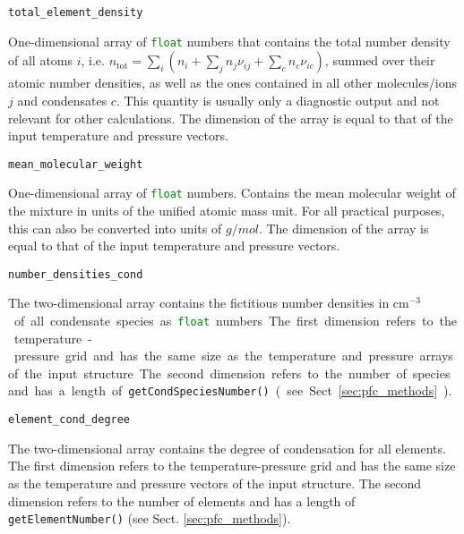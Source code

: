 \documentclass[numbers=noenddot]{aux/fcmanual}
\begin{document}
\bigbreak

\lstinline!total_element_density!
\begin{addmargin}[25pt]{0pt}
	One-dimensional array of \lstinline[language=Python]!float! numbers that contains the total number density of all atoms $i$, i.e. $n_\mathrm{tot} = \sum_i \left( n_i + \sum_j n_j \nu_{ij} + \sum_c n_c \nu_{ic} \right)$, summed over their atomic number densities, as well as the ones contained in all other molecules/ions $j$ and condensates $c$. This quantity is usually only a diagnostic output and not relevant for other calculations. The dimension of the array is equal to that of the input temperature and pressure vectors.
\end{addmargin}

\bigbreak

\lstinline!mean_molecular_weight!
\begin{addmargin}[25pt]{0pt}
	One-dimensional array of \lstinline[language=Python]!float! numbers. Contains the mean molecular weight of the mixture in units of the unified atomic mass unit. For all practical purposes, this can also be converted into units of $\unit{g/mol}$. The dimension of the array is equal to that of the input temperature and pressure vectors.
\end{addmargin}

\bigbreak

\lstinline!number_densities_cond!
\begin{addmargin}[25pt]{0pt}
	The two-dimensional array contains the fictitious number densities in \unit{cm$^{-3}$} of all condensate species  as \lstinline[language=Python]!float! numbers. The first dimension refers to the temperature-pressure grid and has the same size as the temperature and pressure arrays of the input structure. The second dimension refers to the number of species and has a length of \lstinline!getCondSpeciesNumber()! (see Sect. \ref{sec:pfc_methods}).
\end{addmargin}

\bigbreak

\lstinline!element_cond_degree!
\begin{addmargin}[25pt]{0pt}
	The two-dimensional array contains the degree of condensation for all elements. The first dimension refers to the temperature-pressure grid and has the same size as the temperature and pressure vectors of the input structure. The second dimension refers to the number of elements and has a length of \lstinline!getElementNumber()! (see Sect. \ref{sec:pfc_methods}).
\end{addmargin}
\end{document}
